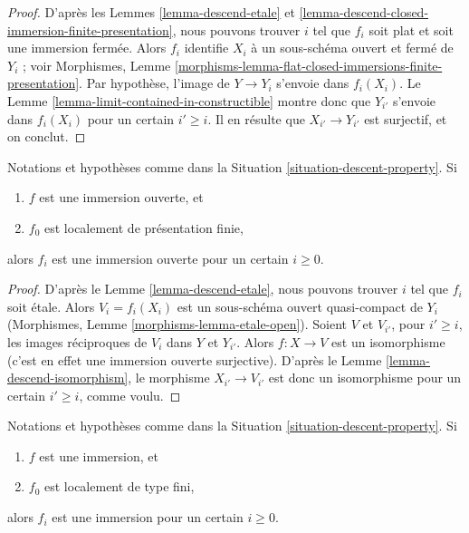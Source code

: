 \begin{proof}
D'après les Lemmes \ref{lemma-descend-etale} et
\ref{lemma-descend-closed-immersion-finite-presentation}, nous pouvons
trouver $i$ tel que $f_i$ soit plat et soit une immersion fermée. Alors $f_i$
identifie $X_i$ à un sous-schéma ouvert et fermé de $Y_i$ ; voir Morphismes,
Lemme \ref{morphisms-lemma-flat-closed-immersions-finite-presentation}. Par
hypothèse, l'image de $Y \to Y_i$ s'envoie dans $f_i(X_i)$. Le
Lemme \ref{lemma-limit-contained-in-constructible} montre donc que $Y_{i'}$
s'envoie dans $f_i(X_i)$ pour un certain $i' \geq i$. Il en résulte que
$X_{i'} \to Y_{i'}$ est surjectif, et on conclut.
\end{proof}

\begin{lemma}
\label{lemma-descend-open-immersion}
Notations et hypothèses comme dans la
Situation \ref{situation-descent-property}. Si
\begin{enumerate}
\item $f$ est une immersion ouverte, et
\item $f_0$ est localement de présentation finie,
\end{enumerate}
alors $f_i$ est une immersion ouverte pour un certain $i \geq 0$.
\end{lemma}

\begin{proof}
D'après le Lemme \ref{lemma-descend-etale}, nous pouvons trouver $i$ tel que
$f_i$ soit étale. Alors $V_i = f_i(X_i)$ est un sous-schéma ouvert
quasi-compact de $Y_i$ (Morphismes,
Lemme \ref{morphisms-lemma-etale-open}). Soient $V$ et $V_{i'}$, pour
$i' \geq i$, les images réciproques de $V_i$ dans $Y$ et $Y_{i'}$. Alors
$f : X \to V$ est un isomorphisme (c'est en effet une immersion ouverte
surjective). D'après le Lemme \ref{lemma-descend-isomorphism}, le morphisme
$X_{i'} \to V_{i'}$ est donc un isomorphisme pour un certain $i' \geq i$,
comme voulu.
\end{proof}

\begin{lemma}
\label{lemma-descend-immersion}
Notations et hypothèses comme dans la
Situation \ref{situation-descent-property}. Si
\begin{enumerate}
\item $f$ est une immersion, et
\item $f_0$ est localement de type fini,
\end{enumerate}
alors $f_i$ est une immersion pour un certain $i \geq 0$.
\end{lemma}

